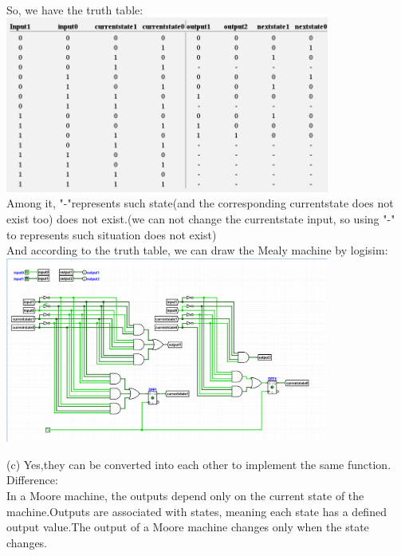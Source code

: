 \documentclass[a4paper]{article}
\begin{document}
\begin{answer}[Question 3]
    \\
    So, we have the truth table:\\
    \includegraphics[width=0.8\textwidth]{hw4_q3_2_truth_table.png}\\
    Among it, "-"represents such state(and the corresponding currentstate does not exist too) does not exist.(we can not change the currentstate input, so using "-" to represents such situation does not exist)\\
    And according to the truth table, we can draw the Mealy machine by logisim:\\
    \includegraphics[width=0.8\textwidth]{hw4_q3_2_logic_circuit_mealy_FSM.png}\\
    \item[(c)]
    Yes,they can be converted into each other to implement the same function.\\
    Difference:\\
    In a Moore machine, the outputs depend only on the current state of the machine.Outputs are associated with states, meaning each state has a defined output value.The output of a Moore machine changes only when the state changes.\\

\end{answer}
\end{document}
